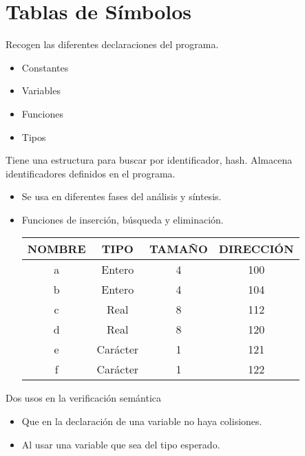 \documentclass[12pt, twoside, openright]{report} %
\begin{document}
\section{Tablas de Símbolos}
Recogen las diferentes declaraciones del programa.
\begin{itemize}
	\item Constantes
	\item Variables
	\item Funciones
	\item Tipos
\end{itemize}

Tiene una estructura para buscar por identificador, hash. Almacena identificadores definidos en el programa.
\begin{itemize}
	\item Se usa en diferentes fases del análisis y síntesis.
	\item Funciones de inserción, búsqueda y eliminación.

	      \begin{table}[h]
		      \begin{tabular}{|c|c|c|c|}
			      \hline
			      \textbf{NOMBRE} & \textbf{TIPO} & \textbf{TAMAÑO} & \textbf{DIRECCIÓN} \\ \hline
			      a               & Entero        & 4               & 100                \\ \hline
			      b               & Entero        & 4               & 104                \\ \hline
			      c               & Real          & 8               & 112                \\ \hline
			      d               & Real          & 8               & 120                \\ \hline
			      e               & Carácter      & 1               & 121                \\ \hline
			      f               & Carácter      & 1               & 122                \\ \hline
		      \end{tabular}
	      \end{table}
\end{itemize}
\pagebreak
Dos usos en la verificación semántica
\begin{itemize}
	\item Que en la declaración de una variable no haya colisiones.
	\item Al usar una variable que sea del tipo esperado.
\end{itemize}
\end{document}

